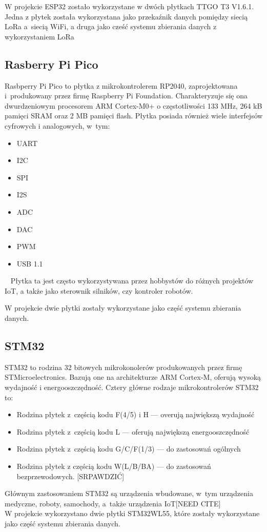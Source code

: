 W projekcie ESP32 zostało wykorzystane w dwóch płytkach TTGO T3 V1.6.1. Jedna z płytek została wykorzystana jako przekaźnik danych pomiędzy siecią LoRa a~siecią WiFi, a druga jako cześć systemu zbierania danych z wykorzystaniem LoRa


\subsection{Rasberry Pi Pico}

Rasbperry Pi Pico to płytka z mikrokontrolerem RP2040, zaprojektowana i~produkowany przez firmę Raspberry Pi Foundation. Charakteryzuje się ona dwurdzeniowym procesorem ARM Cortex-M0+ o częstotliwości 133 MHz, 264 kB pamięci SRAM oraz 2 MB pamięci flash. Płytka posiada również wiele interfejsów cyfrowych i analogowych, w~tym:
\begin{itemize}
    \item UART
    \item I2C
    \item SPI
    \item I2S
    \item ADC
    \item DAC
    \item PWM
    \item USB 1.1
\end{itemize}
~\cite{PICO:datasheet,PICO:doc}
Płytka ta jest często wykorzystywana przez hobbystów do różnych projektów IoT, a także jako sterownik silników, czy kontroler robotów.\cite{PICO:doc}

W projekcie dwie płytki zostały wykorzystane jako część systemu zbierania danych.
\subsection{STM32}
STM32 to rodzina 32 bitowych mikrokonolerów produkowanych przez firmę STMicroelectronics. Bazują one na architekturze ARM Cortex-M, oferują wysoką wydajność i energooszczędność. Cztery główne rodzaje mikrokontrolerów STM32 to:
\begin{itemize}
    \item Rodzina płytek z~częścią kodu F(4/5) i H — overują największą wydajność
    \item Rodzina płytek z~częścią kodu L — oferują największą energooszczędność
    \item Rodzina płytek z~częścią kodu G/C/F(1/3) — do zastosowań ogólnych
    \item Rodzina płytek z częścią kodu W(L/B/BA) — do zastosowań bezprzewodowych. [SRPAWDZIĆ]
\end{itemize}\cite{STM32:overview}
Głównym zastosowaniem STM32 są urządzenia wbudowane, w~tym urządzenia medyczne, roboty, samochody, a~także urządzenia IoT[NEED CITE]
\\
W projekcie wykorzystano dwie płytki STM32WL55, które zostały wykorzystane jako część systemu zbierania danych.


